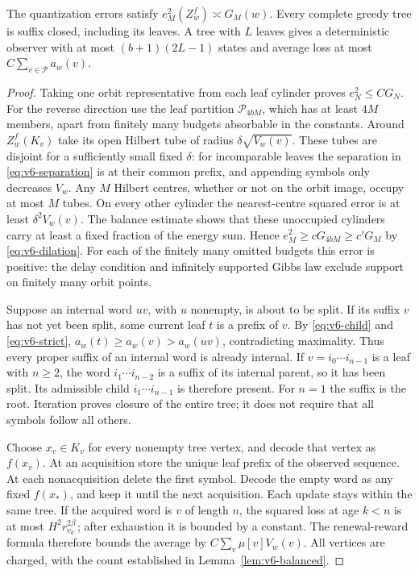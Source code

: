 \begin{lemma}
\label{lem:v6-realization}
The quantization errors satisfy $e_M^2(Z_w^f)\asymp G_M(w)$.
Every complete greedy tree is suffix closed, including its leaves.
A tree with $L$ leaves gives a deterministic observer with at most
$(b+1)(2L-1)$ states and average loss at most $C\sum_{v\in\mathcal P}a_w(v)$.
\end{lemma}
\begin{proof}
Taking one orbit representative from each leaf cylinder proves
$e_N^2\le CG_N$. For the reverse direction use the leaf partition
$\mathcal P_{4bM}$, which has at least $4M$ members, apart from
finitely many budgets absorbable in the constants. Around
$Z_w^f(K_v)$ take its open Hilbert tube of radius $\delta\sqrt{V_w(v)}$.
These tubes are disjoint for a sufficiently small fixed $\delta$:
for incomparable leaves the separation in \eqref{eq:v6-separation}
is at their common prefix, and appending symbols only decreases $V_w$.
Any $M$ Hilbert centres, whether or not on the orbit image, occupy at
most $M$ tubes. On every other cylinder the nearest-centre squared
error is at least $\delta^2V_w(v)$. The balance estimate shows that
these unoccupied cylinders carry at least a fixed fraction of the
energy sum. Hence $e_M^2\ge cG_{4bM}\ge c'G_M$ by
\eqref{eq:v6-dilation}. For each of the finitely many omitted budgets
this error is positive: the delay condition and infinitely supported
Gibbs law exclude support on finitely many orbit points.

Suppose an internal word $uv$, with $u$ nonempty, is about to be
split. If its suffix $v$ has not yet been split, some current leaf
$t$ is a prefix of $v$. By \eqref{eq:v6-child} and
\eqref{eq:v6-strict}, $a_w(t)\ge a_w(v)>a_w(uv)$, contradicting
maximality. Thus every proper suffix of an internal word is already
internal. If $v=i_0\cdots i_{n-1}$ is a leaf with $n\ge2$, the word
$i_1\cdots i_{n-2}$ is a suffix of its internal parent, so it has
been split. Its admissible child $i_1\cdots i_{n-1}$ is therefore
present. For $n=1$ the suffix is the root. Iteration proves closure
of the entire tree; it does not require that all symbols follow
all others.

Choose $x_v\in K_v$ for every nonempty tree vertex, and decode that
vertex as $f(x_v)$. At an acquisition store the unique leaf prefix
of the observed sequence. At each nonacquisition delete the first
symbol. Decode the empty word as any fixed $f(x_*)$, and keep it
until the next acquisition. Each update stays within the same tree.
If the acquired word is $v$ of length $n$, the squared loss at age
$k<n$ is at most $H^2r_{v_{k:}}^{2\beta}$; after exhaustion it is
bounded by a constant. The renewal-reward formula therefore bounds
the average by $C\sum_v\mu[v]V_w(v)$. All vertices are charged, with
the count established in Lemma~\ref{lem:v6-balanced}.
\end{proof}

